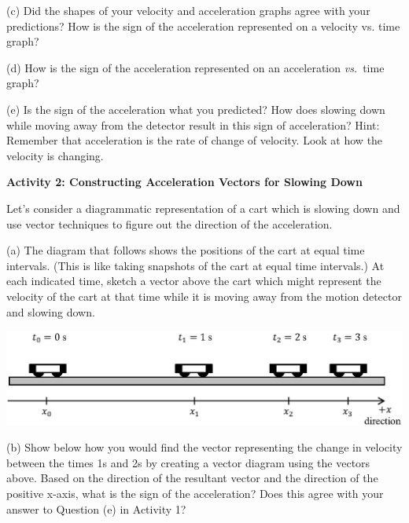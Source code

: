 (c) Did the shapes of your velocity and acceleration graphs agree with your
predictions? How is the sign of the acceleration represented on a velocity vs.
time graph? 
\answerspace{15mm}

(d) How is the sign of the acceleration represented on an acceleration \textit{vs.}~time
graph? 
\answerspace{15mm}

\pagebreak[3]
(e) Is the sign of the acceleration what you predicted? How does slowing down
while moving away from the detector result in this sign of acceleration? Hint:
Remember that acceleration is the rate of change of velocity. Look at how the
velocity is changing.
\answerspace{20mm}

\textbf{Activity 2: Constructing Acceleration Vectors for Slowing Down}

Let's consider a diagrammatic representation of a cart which is slowing down
and use vector techniques to figure out the direction of the acceleration.


(a) The diagram that follows shows the positions of the cart at equal time intervals.
(This is like taking snapshots of the cart at equal time intervals.) At each
indicated time, sketch a vector above the cart which might represent the velocity
of the cart at that time while it is moving away from the motion detector and
slowing down.

\vspace{0.5cm}
{\par\centering \includegraphics{slowing/carts_slowing.eps} \par}
\vspace{0.5cm}

(b) Show below how you would find the vector representing the change in velocity
between the times 1s and 2s by creating a vector diagram using the vectors 
 above. Based on the direction of the resultant vector and the direction of 
the positive x-axis, what is the sign of the acceleration? 
Does this agree with your answer to Question (e) in Activity 1?
\answerspace{25mm}

